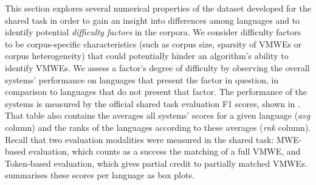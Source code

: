 \documentclass[output=paper,modfonts,nonflat,draftmode]{langsci/langscibook}
\begin{document}
This section explores several numerical properties of the dataset developed for the shared task in order to gain an insight into differences among languages and to identify potential \emph{difficulty factors} in the corpora. We consider difficulty factors to be corpus-specific characteristics (such as corpus size, sparsity of VMWEs or corpus heterogeneity) that could potentially hinder an algorithm's ability to identify VMWEs. We assess a factor's degree of difficulty by observing the overall systems' performance on languages that present the factor in question, in comparison to languages that do not present that factor. The performance of the systems is measured by the official shared task evaluation F1 scores, shown in . That table also contains the averages all systems' scores for a given language (\emph{avg} column) and the ranks of the languages according to these averages (\emph{rnk} column). Recall that two evaluation modalities were measured in the shared task: MWE-based evaluation, which counts as a success the matching of a full VMWE, and Token-based evaluation, which gives partial credit to partially matched VMWEs.  summarises these scores per language as box plots. 
\end{document}
